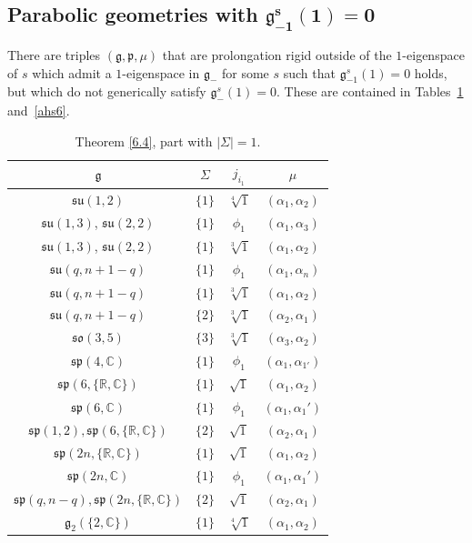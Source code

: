 \documentclass[10pt,a4paper]{amsart}
\newcommand{\Si}{\Sigma}
\newcommand{\fg}{\mathfrak g}
\newcommand{\fp}{\mathfrak p}
\numberwithin{equation}{section}
\begin{document}
\subsection[Parabolic geometries with $\fg_{-1}^s(1)=0$]{Parabolic geometries with $\boldsymbol{\fg_{-1}^s(1)=0}$}\label{sec5.3}
There are triples $(\fg,\fp,\mu)$ that are prolongation rigid outside of the $1$-eigenspace of $s$ which admit a $1$-eigenspace in $\fg_-$ for some $s$ such that $\fg_{-1}^s(1)=0$ holds, but which do not generically satisfy $\fg_-^s(1)=0$. These are contained in Tables~\ref{ahs5} and~\ref{ahs6}.

\begin{table}[th!]\centering\caption{Theorem \ref{6.4}, part with $|\Si|=1$.}\label{ahs5}\vspace{1mm}
\begin{tabular}{|c|c|c|c|}
\hline
$\fg$ & $\Sigma$ & $j_{i_1}$ & $\mu$\\
\hline
\hline
$\mathfrak{su}(1,2)$ & $\{1\}$& $\sqrt[4]{1}$ & $(\alpha_1,\alpha_2)$ \\
\hline
$\mathfrak{su}(1,3)$, $\mathfrak{su}(2,2)$ & $\{1\}$& $\phi_1$ & $(\alpha_1,\alpha_3)$ \\
\hline
$\mathfrak{su}(1,3)$, $\mathfrak{su}(2,2)$ & $\{1\}$&$\sqrt[3]{1}$ & $(\alpha_1,\alpha_2)$ \\
\hline
$\mathfrak{su}(q,n+1-q)$ & $\{1\}$& $\phi_1$ & $(\alpha_1,\alpha_n)$ \\
\hline
$\mathfrak{su}(q,n+1-q)$ & $\{1\}$&$\sqrt[3]{1}$ & $(\alpha_1,\alpha_2)$ \\
\hline
$\mathfrak{su}(q,n+1-q)$ & $\{2\}$ &$\sqrt[3]{1}$& $(\alpha_2,\alpha_1)$\\
\hline
$\mathfrak{so}(3,5)$&$\{ 3\}$&$\sqrt[3]{1}$&$(\alpha_3,\alpha_2)$ \\
\hline
$\mathfrak{sp}(4,\mathbb{C})$ & $\{1\}$&$\phi_1$& $(\alpha_{1},\alpha_{1'})$\\
\hline
$\mathfrak{sp}(6,\{\mathbb{R,C}\})$ & $\{1\}$ &$\sqrt{1}$& $(\alpha_1,\alpha_2)$ \\
\hline
$\mathfrak{sp}(6,\mathbb{C})$ & $\{1\}$&$\phi_1$& $(\alpha_1,\alpha_1')$ \\
\hline
$\mathfrak{sp}(1,2), \mathfrak{sp}(6,\{\mathbb{R, C}\})$ & $\{2\}$& $\sqrt{1}$ & $(\alpha_2,\alpha_1)$ \\
\hline
$\mathfrak{sp}(2n,\{\mathbb{R,C}\})$ & $\{1\}$ &$\sqrt{1}$& $(\alpha_1,\alpha_2)$ \\
\hline
$\mathfrak{sp}(2n,\mathbb{C})$ & $\{1\}$&$\phi_1$& $(\alpha_1,\alpha_1')$ \\
\hline
$\mathfrak{sp}(q,n-q), \mathfrak{sp}(2n,\{\mathbb{R, C}\})$ & $\{2\}$& $\sqrt{1}$ & $(\alpha_2,\alpha_1)$ \\
\hline
$\mathfrak{g}_{2}(\{2,\mathbb{C}\})$ & $\{1\}$&$\sqrt[4]{1}$&$(\alpha_1,\alpha_2)$\\
\hline
\end{tabular}
\end{table}
\end{document}
